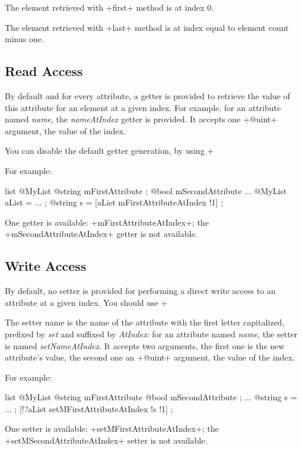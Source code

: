 The element retrieved with \ggs+first+ method is at index 0.

The element retrieved with \ggs+last+ method is at index equal to element count minus one.

\subsection{Read Access}

By default and for every attribute, a getter is provided to retrieve the value of this attribute for an element at a given index. For example, for an attribute named \emph{name}, the \emph{nameAtIndex} getter is provided. It accepts one \ggs+@uint+ argument, the value of the index.

You can disable the default getter generation, by using \ggs+%

For example:
\begin{galgas}
list @MyList {
  @string mFirstAttribute ;
  @bool mSecondAttribute %
}
...
@MyList aList = ... ;
@string s = [aList mFirstAttributeAtIndex !1] ;
\end{galgas}

One getter is available: \ggs+mFirstAttributeAtIndex+; the \ggs+mSecondAttributeAtIndex+ getter is not available.


\subsection{Write Access}

By default, no setter is provided for performing a direct write access to an attribute at a given index. You should use \ggs+%

The setter name is the name of the attribute with the first letter capitalized, prefixed by \emph{set} and suffixed by \emph{AtIndex}: for an attribute named \emph{name}, the setter is named \emph{setNameAtIndex}. It accepts two arguments, the first one is the new attribute's value, the second one an \ggs+@uint+ argument, the value of the index.

For example:

\begin{galgas}
list @MyList {
  @string mFirstAttribute %
  @bool mSecondAttribute ;
}
...
@string s = ... ;
[!?aList setMFirstAttributeAtIndex !s !1] ;
\end{galgas}

One setter is available: \ggs+setMFirstAttributeAtIndex+; the \ggs+setMSecondAttributeAtIndex+ setter is not available.

